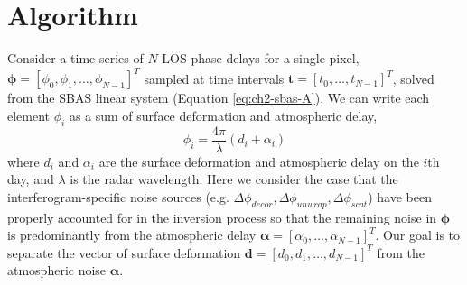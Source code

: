 \section{Algorithm}
Consider a time series of $N$ LOS phase delays for a single pixel,  $ \bm{\phi} = \left[\phi_0, \phi_1, \ldots, \phi_{N-1} \right]^T $ sampled at time intervals $ \bm{t} = \left[t_0, \ldots, t_{N-1} \right]^T $, solved from the SBAS linear system (Equation \eqref{eq:ch2-sbas-A}).
We can write each element $\phi_i$ as a sum of surface deformation and atmospheric delay,
\begin{equation}
	\phi_i = \frac{4 \pi}{\lambda} \left(d_i + \alpha_i \right)
\end{equation}
where $ d_i$ and $\alpha_i$ are the surface deformation and atmospheric delay on the $i$th day, and $ \lambda $ is the radar wavelength.
Here we consider the case that the interferogram-specific noise sources (e.g. $  \Delta \phi_{decor}, \Delta \phi_{unwrap}, \Delta \phi_{scat}  $) have been properly accounted for in the inversion process so that the remaining noise in  $ \bm{\phi} $ is predominantly from the atmospheric delay $ \bm{\alpha} =\left[\alpha_0, \ldots, \alpha_{N-1} \right]^T $.
Our goal is to separate the vector of surface deformation $ \bm{d} =  \left[d_0, d_1, \ldots, d_{N-1} \right]^T $ from the atmospheric noise $ \bm{\alpha} $.


